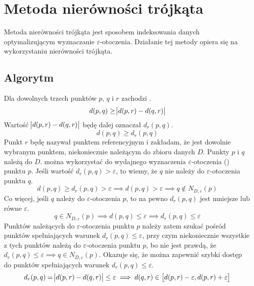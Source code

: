 \section{Metoda nierówności trójkąta}
Metoda nierówności trójkąta jest sposobem indeksowania danych optymalizującym wyznaczanie $ \varepsilon $-otoczenia. Działanie tej metody opiera się na wykorzystaniu nierówności trójkąta. 
\subsection{Algorytm}
Dla dowolnych trzech punktów $ p $, $ q $ i $ r $ zachodzi .
\begin{equation}\label{eq:ti-raw}
	d(p,q) \ge \abs{d(p,r)-d(q,r)}
\end{equation}
Wartość $\abs{ d(p,r) - d(q,r) }$ będę dalej oznaczał $ d_r(p,q) $.
\begin{equation}\label{eq:ti}
	d(p,q) \ge d_r(p,q)
\end{equation}
 Punkt $ r $ będę nazywał punktem referencyjnym i zakładam, że jest dowolnie wybranym punktem, niekoniecznie należącym do zbioru danych $ D $. Punkty $ p $ i $ q $ należą do $ D $.  można wykorzystać do wydajnego wyznaczenia $ \varepsilon $-otoczenia () punktu $ p $. Jeśli wartość $ d_r(p,q) > \varepsilon $, to wiemy, że $ q $ nie należy do $ \varepsilon $-otoczenia punktu $ q $.
\begin{equation}
	d(p,q) \ge d_r(p,q) > \varepsilon \implies d(p,q) > \varepsilon \implies q \notin N_{D,\varepsilon}(p)
\end{equation}
Co więcej, jeśli $ q $ należy do $ \varepsilon $-otoczenia $ p $, to na pewno $ d_r(p,q) $ jest mniejsze lub równe $ \varepsilon $.
\begin{equation}
	q \in N_{D,\varepsilon}(p) \implies d(p,q) \le \varepsilon \implies d_r(p,q) \le \varepsilon
\end{equation}
Punktów należących do $ \varepsilon $-otoczenia punktu $ p $ należy zatem szukać pośród punktów spełniających warunek $ d_r(p,q) \le \varepsilon $, przy czym niekoniecznie wszystkie z tych punktów należą do $ \varepsilon $-otoczenia punktu $ p $, bo nie jest prawdą, że $ d_r(p,q) \le \varepsilon \implies q \in N_{D,\varepsilon}(p)$. Okazuje się, że można zapewnić szybki dostęp do punktów spełniających warunek $ d_r(p,q) \le \varepsilon $.
\begin{equation}\label{eq:ti-search-range}
	d_r(p,q) = \abs{d(p,r)-d(q,r)} \le \varepsilon \implies d(q,r) \in \left[d(p,r)-\varepsilon,d(p,r)+\varepsilon\right]
\end{equation}
